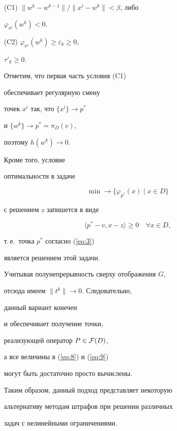 (C1) $ \|w^{k}-w^{k-1} \| / \| x^{i} - w^{k}\| < \beta$, либо


  $\varphi_{x^{i}}(w^{k}) < 0$.





(C2) $\varphi_{x^{i}}(w^{k}) \geq \varepsilon _{k} \geq 0$,


  $\tau'_{k} \geq 0$.


\medskip





Отметим, что первая часть условия (C1)


обеспечивает регулярную смену


точек $x^{i}$ так, что $\{ x^{i} \} \to p^{*}$


 и $\{ w^{k} \} \to p^{*}=\pi_{D}(v)$,


поэтому $h(w^{k}) \to 0$.


Кроме того, условие


оптимальности в задаче


$$


 \min \to \{ \varphi_{p^{*}}(x) \mid x \in D \}


$$


с решением $z$ запишется в виде


$$


 \langle p^{*}-v, x- z \rangle \geq 0 \quad \forall x \in D,


$$


т.\,е.~точка $p^{*}$ согласно (\ref{eq:3})


является решением этой задачи.


Учитывая полунепрерывность сверху отображения $G$,


отсюда имеем $\| t^{k} \| \to 0$. Следовательно,


 данный вариант конечен


 и обеспечивает получение точки,


реализующей оператор $P \in {\cal F} (D)$,


а все величины в (\ref{eq:8}) и (\ref{eq:9})


могут быть достаточно просто вычислены.








 Таким образом, данный подход представляет некоторую


альтернативу методам штрафов при решении различных


задач с нелинейными ограничениями.








